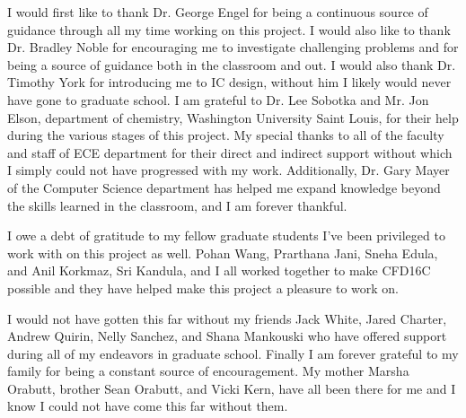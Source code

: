 \documentclass[12pt,oneside,final]{siuethesis}
\theoremstyle{definition}
\begin{document}
\begin{acknowledgements} 

\par I would first like to thank Dr. George Engel for being a continuous source of guidance through all my time working on this project. I would also like to thank Dr. Bradley Noble for encouraging me to investigate challenging problems and for being a source of guidance both in the classroom and out. I would also thank Dr. Timothy York for introducing me to IC design, without him I likely would never have gone to graduate school. I am grateful to  Dr.  Lee  Sobotka  and  Mr.  Jon  Elson,  department  of  chemistry, Washington  University Saint Louis, for their  help  during  the  various  stages  of  this  project. My  special  thanks  to all of the  faculty  and  staff  of  ECE  department  for  their  direct  and indirect support without which I simply could not have progressed with my work. Additionally, Dr. Gary Mayer of the Computer Science department has helped me expand knowledge beyond the skills learned in the classroom, and I am forever thankful. 
\par I owe a debt of gratitude to my fellow graduate students I've been privileged to work with on this project as well. Pohan Wang, Prarthana Jani, Sneha Edula, and Anil Korkmaz, Sri Kandula, and I all worked together to make CFD16C possible and they have helped make this project a pleasure to work on.
\par I would not have gotten this far without my friends Jack White, Jared Charter, Andrew Quirin, Nelly Sanchez, and Shana Mankouski who have offered support during all of my endeavors in graduate school. Finally I am forever grateful to my family for being a constant source of encouragement. My mother Marsha Orabutt, brother Sean Orabutt, and Vicki Kern, have all been there for me and I know I could not have come this far without them.

\end{acknowledgements}

\tableofcontents

\cleardoublepage %

\cleardoublepage

\listoffigures %

\cleardoublepage

\listoftables

\mainmatter %
\end{document}
